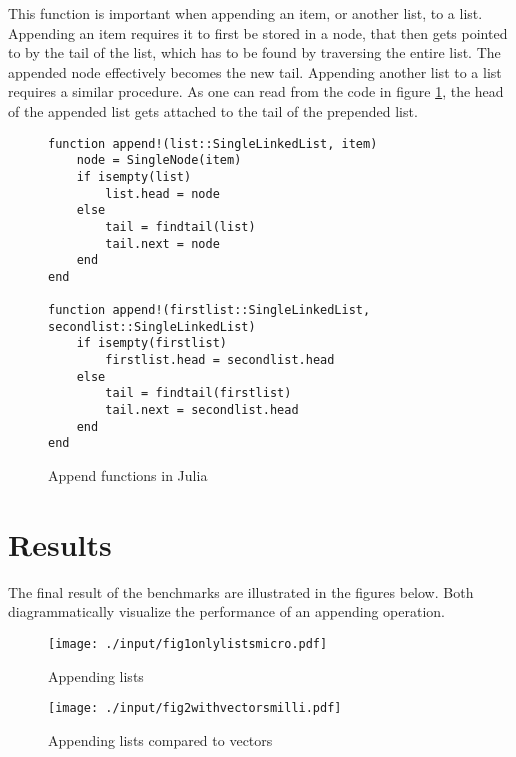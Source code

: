\documentclass[a4paper, 11pt]{article}
\begin{document}
    This function is important when appending an item, or another list, to a list. 
    Appending an item requires it to first be stored in a node, that then gets pointed to 
    by the tail of the list, which has to be found by traversing the entire list. 
    The appended node effectively becomes the new tail. Appending another list to a list
    requires a similar procedure. As one can read from the code in 
    figure \ref{code:appendfunctions}, the head of the appended list gets attached to the tail 
    of the prepended list.
    
    \begin{figure}[H]
    \begin{verbatim}
function append!(list::SingleLinkedList, item)
    node = SingleNode(item)
    if isempty(list)
        list.head = node
    else
        tail = findtail(list) 
        tail.next = node
    end
end

function append!(firstlist::SingleLinkedList, secondlist::SingleLinkedList)
    if isempty(firstlist)
        firstlist.head = secondlist.head
    else
        tail = findtail(firstlist)
        tail.next = secondlist.head
    end
end
    \end{verbatim}
    \caption{Append functions in Julia}
    \label{code:appendfunctions}
    \end{figure}

    \clearpage



    \section*{Results}
    The final result of the benchmarks are illustrated in the figures below.
    Both diagrammatically visualize the performance of an appending operation. 
    
    \begin{figure}[h]
        \centering
        \texttt{[image: ./input/fig1onlylistsmicro.pdf]}
        \caption{Appending lists}
        \label{fig:appendlists}
    \end{figure}


    \begin{figure}[h]
        \centering
        \texttt{[image: ./input/fig2withvectorsmilli.pdf]}
        \caption{Appending lists compared to vectors}
        \label{fig:appendlistscomparedtovectors}
    \end{figure}
\end{document}

